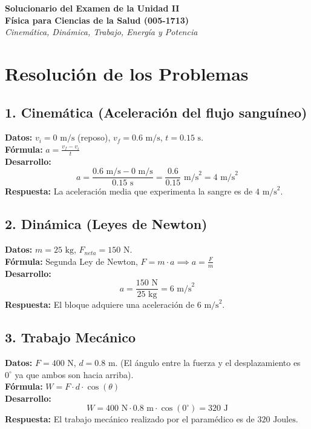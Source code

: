 \documentclass[12pt,letterpaper]{article}
\begin{document}
\begin{center}
    \textbf{\Large Solucionario del Examen de la Unidad II}\\
    \vspace{0.2cm}
    \textbf{Física para Ciencias de la Salud (005-1713)}\\
    \vspace{0.2cm}
    \textit{Cinemática, Dinámica, Trabajo, Energía y Potencia}
\end{center}

\vspace{0.5cm}

\section*{Resolución de los Problemas}

\subsection*{1. Cinemática (Aceleración del flujo sanguíneo)}
\textbf{Datos:} $v_i = 0 \text{ m/s}$ (reposo), $v_f = 0.6 \text{ m/s}$, $t = 0.15 \text{ s}$. \\
\textbf{Fórmula:} $a = \frac{v_f - v_i}{t}$ \\
\textbf{Desarrollo:} 
\[ a = \frac{0.6 \text{ m/s} - 0 \text{ m/s}}{0.15 \text{ s}} = \frac{0.6}{0.15} \text{ m/s}^2 = 4 \text{ m/s}^2 \]
\textbf{Respuesta:} La aceleración media que experimenta la sangre es de \textbf{$4 \text{ m/s}^2$}.

\subsection*{2. Dinámica (Leyes de Newton)}
\textbf{Datos:} $m = 25 \text{ kg}$, $F_{neta} = 150 \text{ N}$. \\
\textbf{Fórmula:} Segunda Ley de Newton, $F = m \cdot a \implies a = \frac{F}{m}$ \\
\textbf{Desarrollo:} 
\[ a = \frac{150 \text{ N}}{25 \text{ kg}} = 6 \text{ m/s}^2 \]
\textbf{Respuesta:} El bloque adquiere una aceleración de \textbf{$6 \text{ m/s}^2$}.

\subsection*{3. Trabajo Mecánico}
\textbf{Datos:} $F = 400 \text{ N}$, $d = 0.8 \text{ m}$. (El ángulo entre la fuerza y el desplazamiento es $0^\circ$ ya que ambos son hacia arriba). \\
\textbf{Fórmula:} $W = F \cdot d \cdot \cos(\theta)$ \\
\textbf{Desarrollo:} 
\[ W = 400 \text{ N} \cdot 0.8 \text{ m} \cdot \cos(0^\circ) = 320 \text{ J} \]
\textbf{Respuesta:} El trabajo mecánico realizado por el paramédico es de \textbf{$320 \text{ Joules}$}.
\end{document}
